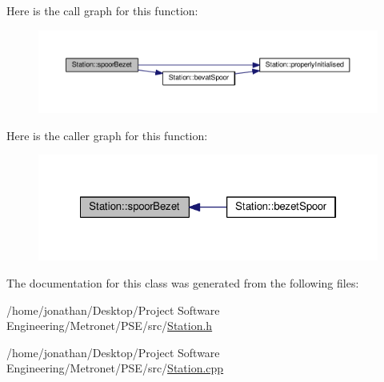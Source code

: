 Here is the call graph for this function\+:
\nopagebreak
\begin{figure}[H]
\begin{center}
\leavevmode
\includegraphics[width=350pt]{class_station_ab8a40b1e5d3b6228a3a173dd0140a5fb_cgraph}
\end{center}
\end{figure}




Here is the caller graph for this function\+:
\nopagebreak
\begin{figure}[H]
\begin{center}
\leavevmode
\includegraphics[width=322pt]{class_station_ab8a40b1e5d3b6228a3a173dd0140a5fb_icgraph}
\end{center}
\end{figure}




The documentation for this class was generated from the following files\+:\begin{DoxyCompactItemize}
\item 
/home/jonathan/\+Desktop/\+Project Software Engineering/\+Metronet/\+P\+S\+E/src/\hyperlink{_station_8h}{Station.\+h}\item 
/home/jonathan/\+Desktop/\+Project Software Engineering/\+Metronet/\+P\+S\+E/src/\hyperlink{_station_8cpp}{Station.\+cpp}\end{DoxyCompactItemize}
